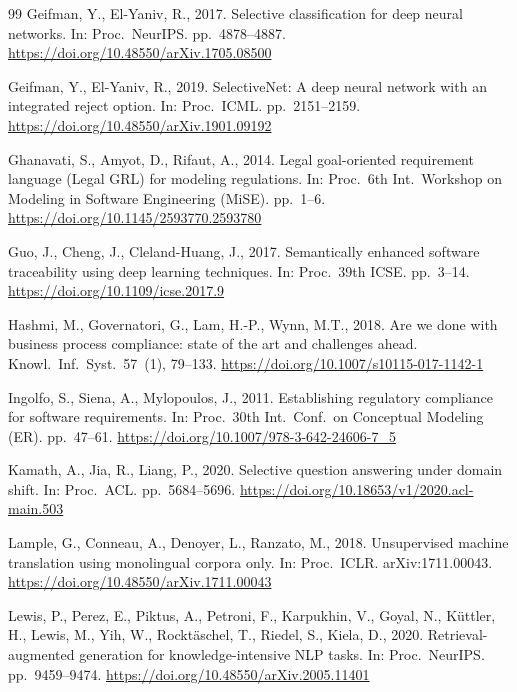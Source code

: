 \documentclass[a4paper,fleqn]{cas-sc}
\begin{document}
\begin{thebibliography}{99}
Geifman, Y., El-Yaniv, R., 2017. Selective classification for deep neural networks. In: Proc.\ NeurIPS. pp.\ 4878--4887. \url{https://doi.org/10.48550/arXiv.1705.08500}

Geifman, Y., El-Yaniv, R., 2019. SelectiveNet: A deep neural network with an integrated reject option. In: Proc.\ ICML. pp.\ 2151--2159. \url{https://doi.org/10.48550/arXiv.1901.09192}

Ghanavati, S., Amyot, D., Rifaut, A., 2014. Legal goal-oriented requirement language (Legal GRL) for modeling regulations. In: Proc.\ 6th Int.\ Workshop on Modeling in Software Engineering (MiSE). pp.\ 1--6. \url{https://doi.org/10.1145/2593770.2593780}

Guo, J., Cheng, J., Cleland-Huang, J., 2017. Semantically enhanced software traceability using deep learning techniques. In: Proc.\ 39th ICSE. pp.\ 3--14. \url{https://doi.org/10.1109/icse.2017.9}

Hashmi, M., Governatori, G., Lam, H.-P., Wynn, M.T., 2018. Are we done with business process compliance: state of the art and challenges ahead. Knowl.\ Inf.\ Syst.\ 57~(1), 79--133. \url{https://doi.org/10.1007/s10115-017-1142-1}

Ingolfo, S., Siena, A., Mylopoulos, J., 2011. Establishing regulatory compliance for software requirements. In: Proc.\ 30th Int.\ Conf.\ on Conceptual Modeling (ER). pp.\ 47--61. \url{https://doi.org/10.1007/978-3-642-24606-7_5}

Kamath, A., Jia, R., Liang, P., 2020. Selective question answering under domain shift. In: Proc.\ ACL. pp.\ 5684--5696. \url{https://doi.org/10.18653/v1/2020.acl-main.503}

Lample, G., Conneau, A., Denoyer, L., Ranzato, M., 2018. Unsupervised machine translation using monolingual corpora only. In: Proc.\ ICLR. arXiv:1711.00043. \url{https://doi.org/10.48550/arXiv.1711.00043}

Lewis, P., Perez, E., Piktus, A., Petroni, F., Karpukhin, V., Goyal, N., K\"uttler, H., Lewis, M., Yih, W., Rockt\"aschel, T., Riedel, S., Kiela, D., 2020. Retrieval-augmented generation for knowledge-intensive NLP tasks. In: Proc.\ NeurIPS. pp.\ 9459--9474. \url{https://doi.org/10.48550/arXiv.2005.11401}


\end{thebibliography}
\end{document}
